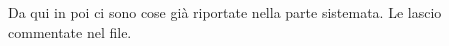 \documentclass{article}
\newtheorem{defn}[thm]{Definition}
\theoremstyle{definition}
\newtheorem{rem}[thm]{Remark}
\begin{document}
{\Huge Da qui in poi ci sono cose gi\`a riportate nella parte sistemata. Le lascio commentate nel file.} 
%
%
%
%
\end{document}
